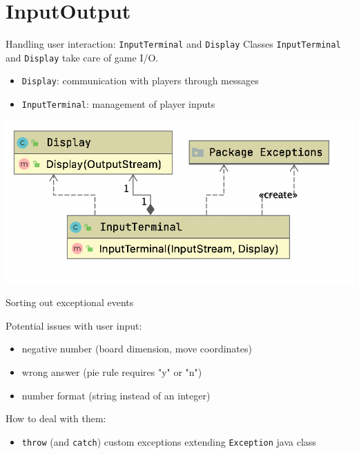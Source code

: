 \documentclass{beamer}
\begin{document}
\section{InputOutput}

\begin{frame}{Handling user interaction: \texttt{InputTerminal} and \texttt{Display}}
 Classes \texttt{InputTerminal} and \texttt{Display} take care of game I/O.

 \begin{itemize}
  \item \texttt{Display}: communication with players through messages
   \item \texttt{InputTerminal}: management of player inputs
 \end{itemize}
 
   \begin{center}
       \includegraphics[scale=0.45]{images/inputoutput.png}
      \end{center}
\end{frame}

\begin{frame}{Sorting out exceptional events}

 Potential issues with user input:
 \begin{itemize}
  \item negative number (board dimension, move coordinates)
  \item wrong answer (pie rule requires "y" or "n")
  \item number format (string instead of an integer)
 \end{itemize}
 
 \vspace{0.7cm}
 
 How to deal with them:
 \begin{itemize}
  \item \texttt{throw} (and \texttt{catch}) custom exceptions extending \texttt{Exception} java class
 \end{itemize}
 
\end{frame}
\end{document}
